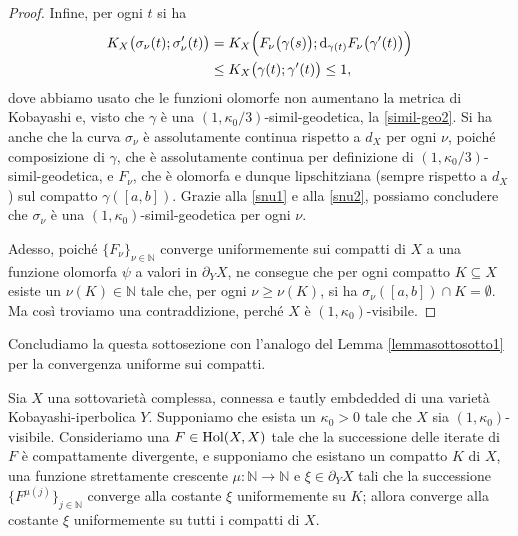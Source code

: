 \begin{proof}
    Infine, per ogni $t$ si ha
    \begin{equation} \label{snu2}
        \begin{aligned}
            K_X\big(\sigma_\nu(t);\sigma_\nu'(t)\big)&=K_X\Big(F_\nu\big(\gamma(s)\big);\mathop{}\!\mathrm{d}_{\gamma(t)}F_\nu\big(\gamma'(t)\big)\Big) \\
            &\le K_X\big(\gamma(t);\gamma'(t)\big) \le 1,
        \end{aligned}
    \end{equation}
    dove abbiamo usato che le funzioni olomorfe non aumentano la metrica di Kobayashi e, visto che $\gamma$ è una $(1,\kappa_0/3)$-simil-geodetica, la \eqref{simil-geo2}. Si ha anche che la curva $\sigma_\nu$ è assolutamente continua rispetto a $d_X$ per ogni $\nu$, poiché composizione di $\gamma$, che è assolutamente continua per definizione di $(1,\kappa_0/3)$-simil-geodetica, e $F_\nu$, che è olomorfa e dunque lipschitziana (sempre rispetto a $d_X$) sul compatto $\gamma([a,b])$. Grazie alla \eqref{snu1} e alla \eqref{snu2}, possiamo concludere che $\sigma_\nu$ è una $(1,\kappa_0)$-simil-geodetica per ogni $\nu$.
    
    Adesso, poiché $\{F_\nu\}_{\nu\in\mathbb{N}}$ converge uniformemente sui compatti di $X$ a una funzione olomorfa $\psi$ a valori in $\partial_YX$, ne consegue che per ogni compatto $K\subseteq X$ esiste un $\nu(K)\in\mathbb{N}$ tale che, per ogni $\nu\ge\nu(K)$, si ha $\sigma_\nu([a,b])\cap K=\emptyset$. Ma così troviamo una contraddizione, perché $X$ è $(1,\kappa_0)$-visibile.
\end{proof}

Concludiamo la questa sottosezione con l'analogo del Lemma \ref{lemmasottosotto1} per la convergenza uniforme sui compatti.

\begin{lm} \label{lemmasottosotto2}
    Sia $X$ una sottovarietà complessa, connessa e tautly embdedded di una varietà Kobayashi-iperbolica $Y$. Supponiamo che esista un $\kappa_0>0$ tale che $X$ sia $(1,\kappa_0)$-visibile. Consideriamo una $F\in\textnormal{Hol}(X,X)$ tale che la successione delle iterate di $F$ è compattamente divergente, e supponiamo che esistano un compatto $K$ di $X$, una funzione strettamente crescente $\mu:\mathbb{N}\longrightarrow\mathbb{N}$ e $\xi\in\partial_YX$ tali che la successione $\{F^{\mu(j)}\}_{j\in\mathbb{N}}$ converge alla costante $\xi$ uniformemente su $K$; allora converge alla costante $\xi$ uniformemente su tutti i compatti di $X$.
\end{lm}

